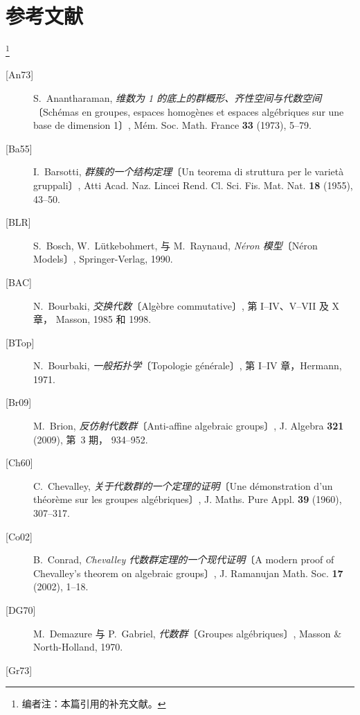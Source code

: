 \section*{参考文献}
\label{bib:sga3-VIB}%
\footnote{\label{note:sga3-VIB-140}编者注：本篇引用的补充文献。}

\begin{description}
\item[{[An73]}]\label{bib:sga3-VIB-An73}%
  S.~Anantharaman,
  \emph{维数为 1 的底上的群概形、齐性空间与代数空间}〔Sch\'emas en groupes, espaces homog\`enes et espaces
  alg\'ebriques sur une base de dimension 1〕,
  M\'em. Soc. Math. France \textbf{33} (1973), 5--79.
\item[{[Ba55]}]\label{bib:sga3-VIB-Ba55}%
  I.~Barsotti,
  \emph{群簇的一个结构定理}〔Un teorema di struttura per le variet\`a gruppali〕,
  Atti Acad. Naz. Lincei Rend. Cl. Sci. Fis. Mat. Nat.
  \textbf{18} (1955), 43--50.
\item[{[BLR]}]\label{bib:sga3-VIB-BLR}%
  S.~Bosch, W.~L\"utkebohmert, 与 M.~Raynaud,
  \emph{Néron 模型}〔N\'eron Models〕, Springer-Verlag, 1990.
\item[{[BAC]}]\label{bib:sga3-VIB-BAC}%
  N.~Bourbaki,
  \emph{交换代数}〔Alg\`ebre commutative〕, 第 I--IV、V--VII 及 X 章， Masson, 1985 和 1998.
\item[{[BTop]}]\label{bib:sga3-VIB-BTop}%
  N.~Bourbaki,
  \emph{一般拓扑学}〔Topologie g\'en\'erale〕, 第 I--IV 章，Hermann,
  1971.
\item[{[Br09]}]\label{bib:sga3-VIB-Br09}%
  M.~Brion,
  \emph{反仿射代数群}〔Anti-affine algebraic groups〕,
  J. Algebra \textbf{321} (2009), 第~3 期， 934--952.
\item[{[Ch60]}]\label{bib:sga3-VIB-Ch60}%
  C.~Chevalley,
  \emph{关于代数群的一个定理的证明}〔Une d\'emonstration d'un th\'eor\`eme sur les groupes
  alg\'ebriques〕,
  J. Maths. Pure Appl. \textbf{39} (1960), 307--317.
\item[{[Co02]}]\label{bib:sga3-VIB-Co02}%
  B.~Conrad,
  \emph{Chevalley 代数群定理的一个现代证明}〔A modern proof of Chevalley's theorem on algebraic
  groups〕,
  J. Ramanujan Math. Soc. \textbf{17} (2002), 1--18.
\item[{[DG70]}]\label{bib:sga3-VIB-DG70}%
  M.~Demazure 与 P.~Gabriel,
  \emph{代数群}〔Groupes alg\'ebriques〕, Masson \& North-Holland,
  1970.
\item[{[Gr73]}]\label{bib:sga3-VIB-Gr73}%

\end{description}

